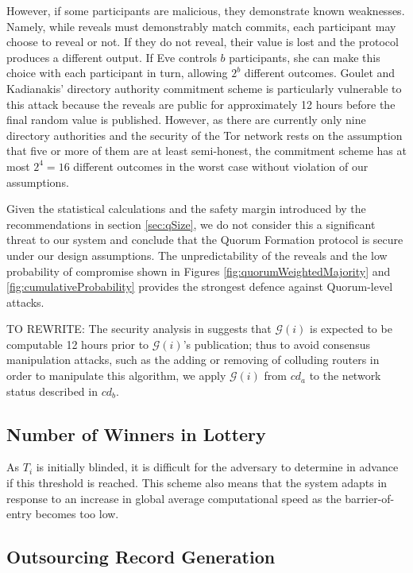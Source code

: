 \documentclass[USenglish,oneside,twocolumn]{article}
\begin{document}
However, if some participants are malicious, they demonstrate known weaknesses. Namely, while reveals must demonstrably match commits, each participant may choose to reveal or not. If they do not reveal, their value is lost and the protocol produces a different output. If Eve controls $ b $ participants, she can make this choice with each participant in turn, allowing $ 2^{b} $ different outcomes. Goulet and Kadianakis' directory authority commitment scheme is particularly vulnerable to this attack because the reveals are public for approximately 12 hours before the final random value is published. However, as there are currently only nine directory authorities and the security of the Tor network rests on the assumption that five or more of them are at least semi-honest, the commitment scheme has at most $ 2^{4} = 16 $ different outcomes in the worst case without violation of our assumptions. 

Given the statistical calculations and the safety margin introduced by the recommendations in section \ref{sec:qSize}, we do not consider this a significant threat to our system and conclude that the Quorum Formation protocol is secure under our design assumptions. The unpredictability of the reveals and the low probability of compromise shown in Figures \ref{fig:quorumWeightedMajority} and \ref{fig:cumulativeProbability} provides the strongest defence against Quorum-level attacks.

 TO REWRITE: The security analysis in \cite{GouletCommitReveal} suggests that $ \mathcal{G}(i) $ is expected to be computable 12 hours prior to $ \mathcal{G}(i) $'s publication; thus to avoid consensus manipulation attacks, such as the adding or removing of colluding routers in order to manipulate this algorithm, we apply $ \mathcal{G}(i) $ from $ \mathit{cd}_{a} $ to the network status described in $ \mathit{cd}_{b} $.
\subsection{Number of Winners in Lottery}
\label{sec:lotteryWinners}

 As $ T_{i} $ is initially blinded, it is difficult for the adversary to determine in advance if this threshold is reached. This scheme also means that the system adapts in response to an increase in global average computational speed as the barrier-of-entry becomes too low.

\subsection{Outsourcing Record Generation}
\end{document}
